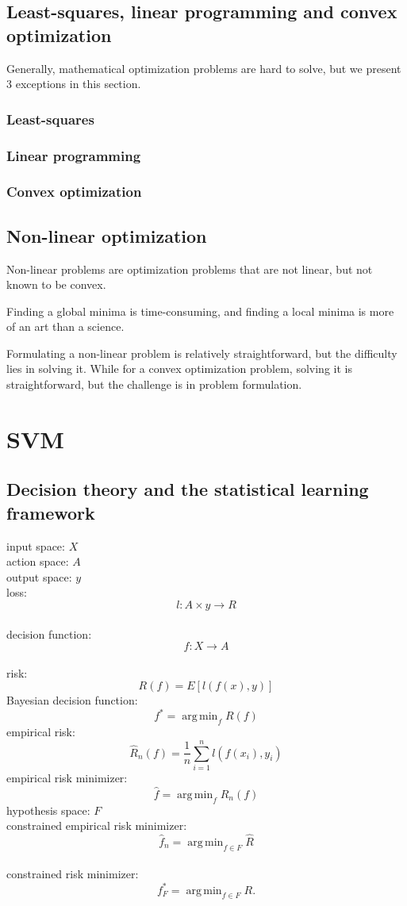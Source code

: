 \documentclass{report}
\DeclareMathOperator*{\argmin}{arg\,min}
\begin{document}
\section{Least-squares, linear programming and convex optimization}
Generally, mathematical optimization problems are hard to solve, but we present 3 exceptions in this section.
\subsection{Least-squares}
\subsection{Linear programming}
\subsection{Convex optimization}
\section{Non-linear optimization}
Non-linear problems are optimization problems that are not linear, but not known to be convex.

Finding a global minima is time-consuming, and finding a local minima is more of an art than a science.

Formulating a non-linear problem is relatively straightforward, but the difficulty lies in solving it. While for a convex optimization problem, solving it is straightforward, but the challenge is in problem formulation. 
\chapter{SVM}
\section{Decision theory and the statistical learning framework}
\noindent input space: $X$\\
action space: $A$\\
output space: $y$\\
loss: \[ l: A \times y \to R\]\\
decision function: \[ f: X \to A\] \\
risk: \[R(f) = E[l(f(x), y)] \]
Bayesian decision function: \[ f^{\ast} = \argmin_{f} R(f) \]
empirical risk: \[
\hat{R}_n(f) = \frac{1}{n} \sum_{i=1}^{n} l(f(x_i), y_i)\]
empirical risk minimizer: \[
	\hat{f} = \argmin_{f} \hat{R}_n(f)
\] 
hypothesis space: $F$ \\
constrained empirical risk minimizer: \[
	\hat{f}_{n} = \argmin_{f \in F} \hat{R}
\] \\
constrained risk minimizer: \[
	f^{\ast}_{F} = \argmin_{f \in F} R
.\] 
\end{document}
